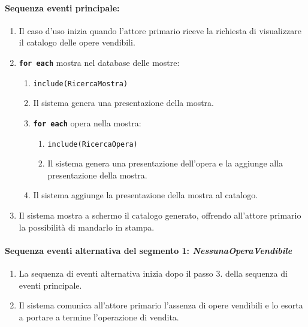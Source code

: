 \documentclass{article}
\begin{document}
	\paragraph{Sequenza eventi principale:}
\begin{enumerate}[itemsep=8pt,parsep=0pt]
    \item Il caso d'uso inizia quando l'attore primario riceve la richiesta di visualizzare il catalogo delle opere vendibili.
    
    \item \texttt{\textbf{for each}} mostra nel database delle mostre:
		\begin{enumerate}	[leftmargin=28pt]
		    \item   \texttt{include(RicercaMostra)}
			\item Il sistema genera una presentazione della mostra.
		    \item \texttt{\textbf{for each}} opera nella mostra:
				\begin{enumerate}	[leftmargin=28pt]
				    \item   \texttt{include(RicercaOpera)}
					\item Il sistema genera una presentazione dell'opera e la aggiunge alla presentazione della mostra.
			    \end{enumerate}
			\item Il sistema aggiunge la presentazione della mostra al catalogo.
		\end{enumerate}
	\item Il sistema mostra a schermo il catalogo generato, offrendo all'attore primario la possibilità di mandarlo in stampa.
    
\end{enumerate}
    
    
	\paragraph{Sequenza eventi alternativa del segmento 1: \emph{NessunaOperaVendibile}}
		\begin{enumerate}[itemsep=8pt,parsep=0pt]
				\item La sequenza di eventi alternativa inizia dopo il passo 3. della sequenza di eventi principale.
				\item Il sistema comunica all'attore primario l'assenza di opere vendibili e lo esorta a portare a termine l'operazione di vendita.
		\end{enumerate}
   
\end{document}
